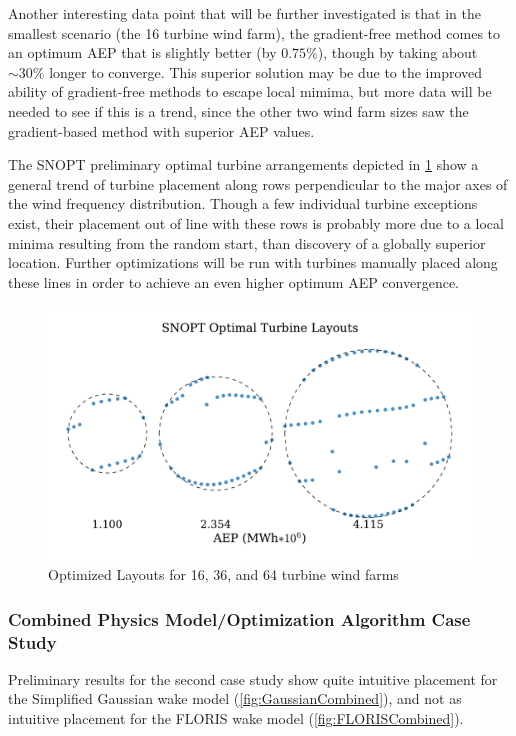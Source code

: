 \documentclass[]{aiaa-tc}
\begin{document}
Another interesting data point that will be further investigated is that in the smallest scenario (the 16 turbine wind farm), the gradient-free method comes to an optimum AEP that is slightly better (by $0.75\%$),  though by taking about $\sim30\%$ longer to converge. This superior solution may be due to the improved ability of gradient-free methods to escape local mimima, but more data will be needed to see if this is a trend, since the other two wind farm sizes saw the gradient-based method with superior AEP values.

The SNOPT preliminary optimal turbine arrangements depicted in \cref{fig:SNOPTLayouts} show a general trend of turbine placement along rows perpendicular to the major axes of the wind frequency distribution. Though a few individual turbine exceptions exist, their placement out of line with these rows is probably more due to a local minima resulting from the random start, than discovery of a globally superior location. Further optimizations will be run with turbines manually placed along these lines in order to achieve an even higher optimum AEP convergence.

\begin{figure}[H]
	\centering
	\includegraphics[width=\textwidth]{SNOPTlayouts.pdf}
	\caption{Optimized Layouts for 16, 36, and 64 turbine wind farms}
	\label{fig:SNOPTLayouts}
\end{figure}

\subsubsection{Combined Physics Model/Optimization Algorithm Case Study}

Preliminary results for the second case study show quite intuitive placement for the Simplified Gaussian wake model (\cref{fig:GaussianCombined}), and not as intuitive placement for the FLORIS wake model (\cref{fig:FLORISCombined}).
\end{document}
